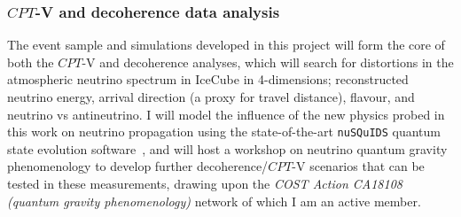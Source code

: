 \documentclass[a4paper,11pt]{article}
\begin{document}


\subsubsection{$CPT$-V and decoherence data analysis}

The event sample and simulations developed in this project will form the core of both the $CPT$-V and decoherence analyses, which will search for distortions in the atmospheric neutrino spectrum in IceCube in 4-dimensions; reconstructed neutrino energy, arrival direction (a proxy for travel distance), flavour, and neutrino vs antineutrino. I will model the influence of the new physics probed in this work on neutrino propagation using the state-of-the-art \texttt{nuSQuIDS} quantum state evolution software~\cite{Delgado:2014kpa, nusquidsGIT}, and will host a workshop on neutrino quantum gravity phenomenology to develop further decoherence/$CPT$-V scenarios that can be tested in these measurements, drawing upon the \textit{COST Action CA18108 (quantum gravity phenomenology)} network of which I am an active member. 

\end{document}
